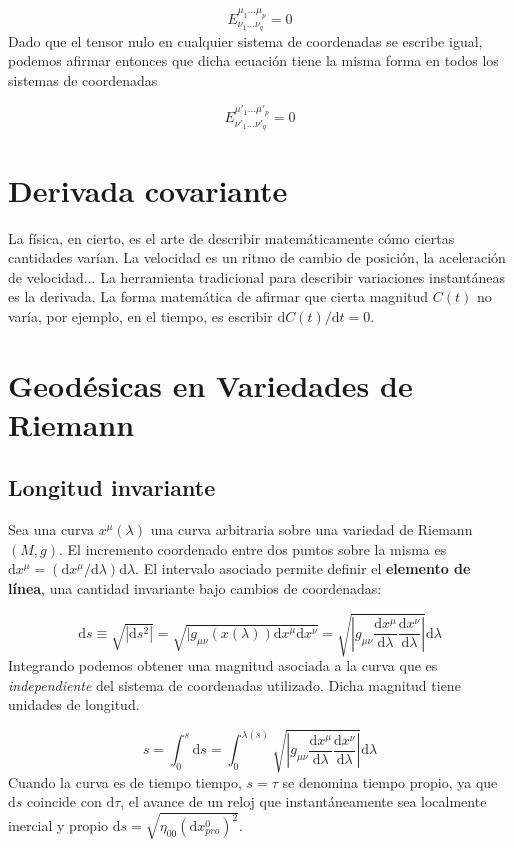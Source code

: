 \documentclass[12pt,a4paper]{book}
\numberwithin{equation}{section}
\numberwithin{figure}{section}
\newcommand{\D}{\mathrm{d}}
\newcommand{\derivadas}[2]{\frac{\D #1}{\D #2}}
\begin{document}
\begin{equation}
E^{\mu_1 \ldots \mu_p}_{\nu_1\ldots\nu_q} = 0
\end{equation}
Dado que el tensor nulo en cualquier sistema de coordenadas se escribe igual, podemos afirmar entonces que dicha ecuación tiene la misma forma en todos los sistemas de coordenadas

\begin{equation}
E^{\mu'_1 \ldots \mu'_p}_{\nu'_1\ldots\nu'_q} = 0
\end{equation}


\section{Derivada covariante}

La física, en cierto, es el arte de describir matemáticamente cómo ciertas cantidades varían. La velocidad es un ritmo de cambio de posición, la aceleración de velocidad... La herramienta tradicional para describir variaciones instantáneas es la derivada. La forma matemática de afirmar que cierta magnitud $C(t)$ no varía, por ejemplo, en el tiempo, es escribir $\D C(t)/\D t = 0$. 


\section{Geodésicas en Variedades de Riemann}

\subsection{Longitud invariante}

Sea una curva $x^\mu (\lambda)$ una curva arbitraria sobre una variedad de Riemann $(M,g)$. El incremento coordenado entre dos puntos sobre la misma es $\D x^\mu = (\D x^\mu / \D \lambda) \D \lambda$. El intervalo asociado permite definir el \textbf{elemento de línea}, una cantidad invariante bajo cambios de coordenadas:


\begin{equation}
\D s \equiv \sqrt{|\D s^2 |} = \sqrt{|g_{\mu \nu} (x(\lambda)) \D x^\mu \D x^\nu} = \sqrt{\left| g_{\mu \nu} \derivadas{x^\mu}{\lambda} \derivadas{x^\nu}{\lambda} \right|} \D \lambda
\end{equation}
Integrando podemos obtener una magnitud asociada a la curva que es \textit{independiente} del sistema de coordenadas utilizado. Dicha magnitud tiene unidades de longitud.

\begin{equation}
s = \int_0^s \D s = \int_0^{\lambda(s)} \sqrt{\left| g_{\mu \nu} \derivadas{x^\mu}{\lambda} \derivadas{x^\nu}{\lambda} \right|} \D \lambda
\end{equation}
Cuando la curva es de tiempo tiempo, $s=\tau$ se denomina tiempo propio, ya que $\D s $ coincide con $\D \tau$, el avance de un reloj que instantáneamente sea localmente inercial y propio $\D s = \sqrt{\eta_{00} (\D x^0_{pro})^2}$. \\
\end{document}
